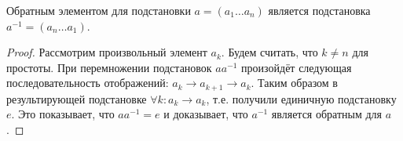 \begin{theorem}
    Обратным элементом для подстановки $a=(a_1 \dots a_n)$ является подстановка $a^{-1}=(a_n \dots a_1)$.
\end{theorem}
\begin{proof}
    Рассмотрим произвольный элемент $a_k$. Будем считать, что $k \ne n$ для простоты. При перемножении подстановок $a a^{-1}$ произойдёт следующая последовательность отображений: $a_k \to a_{k+1} \to a_k$. Таким образом в результирующей подстановке $\forall k: a_k \to a_k$, т.е. получили единичную подстановку $e$. Это показывает, что $a a^{-1}=e$ и доказывает, что $a^{-1}$ является обратным для $a$.
\end{proof}
